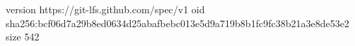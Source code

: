 version https://git-lfs.github.com/spec/v1
oid sha256:bcf06d7a29b8ed0634d25abafbebc013e5d9a719b8b1fc9fc38b21a3e8de53e2
size 542
